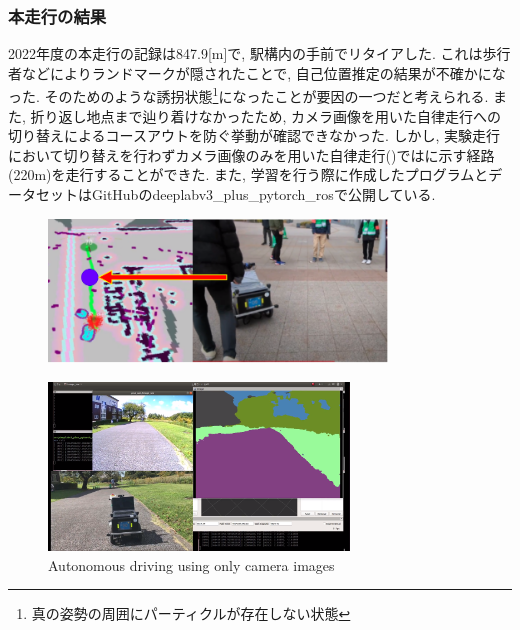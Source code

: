 \documentclass[uplatex, twocolumn, 9pt]{jsproceedings}
\begin{document}
\newpage
\subsubsection{本走行の結果}
2022年度の本走行の記録は847.9[m]で, 駅構内の手前でリタイアした. これは歩行者などによりランドマークが隠されたことで, 自己位置推定の結果が不確かになった. そのためのような誘拐状態\footnote[3]{真の姿勢の周囲にパーティクルが存在しない状態}\cite{emcl-thesis}になったことが要因の一つだと考えられる. また, 折り返し地点まで辿り着けなかったため, カメラ画像を用いた自律走行への切り替えによるコースアウトを防ぐ挙動が確認できなかった. しかし, 実験走行において切り替えを行わずカメラ画像のみを用いた自律走行()ではに示す経路(220m)を走行することができた. また, 学習を行う際に作成したプログラムとデータセットはGitHubのdeeplabv3\_plus\_pytorch\_ros\cite{DeeplabV3}で公開している.

\begin{figure}[h]
  \centering

  \includegraphics[width=90mm]{fig/kidnapped5.pdf}
  \caption{}
  \label{fig:kidnapped}%
\end{figure}


\begin{figure}[h]
  \centering
  \includegraphics[width=80mm]{fig/seg-only.pdf}
  \caption{Autonomous driving using only camera images}
  \label{fig:seg-only}%
\end{figure}
\end{document}
